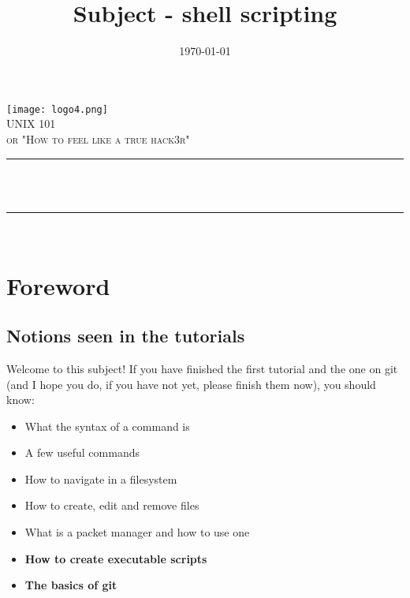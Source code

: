\documentclass[12pt]{article}
\title{Subject - shell scripting}								%
\date{\today}											%
\makeatletter
\let\thetitle\@title
\let\thedate\@date
\makeatother
\begin{document}

\begin{titlepage}
	\centering
    \vspace*{0.5 cm}
    \texttt{[image: logo4.png]}\\[1.0 cm]
    \textsc{\LARGE \newline\newline UNIX 101}\\[2.0 cm]
	\textsc{\Large or "How to feel like a true hack3r"}\\[0.5 cm]
	\rule{\linewidth}{0.2 mm} \\[0.4 cm]
	{ \huge \bfseries \thetitle}\\
	\rule{\linewidth}{0.2 mm} \\[1.5 cm]
	
    \thedate
    
    
    
	
\end{titlepage}


\tableofcontents
\pagebreak


\section{Foreword}
\subsection{Notions seen in the tutorials}

Welcome to this subject! If you have finished the first tutorial and the one on git (and I hope you do, if you have not yet, please finish them now), you should know:

\begin{itemize}
\item What the syntax of a command is
\item A few useful commands
\item How to navigate in a filesystem
\item How to create, edit and remove files
\item What is a packet manager and how to use one 
\item \textbf{How to create executable scripts}
\item \textbf{The basics of git}

\end{itemize}
\end{document}
